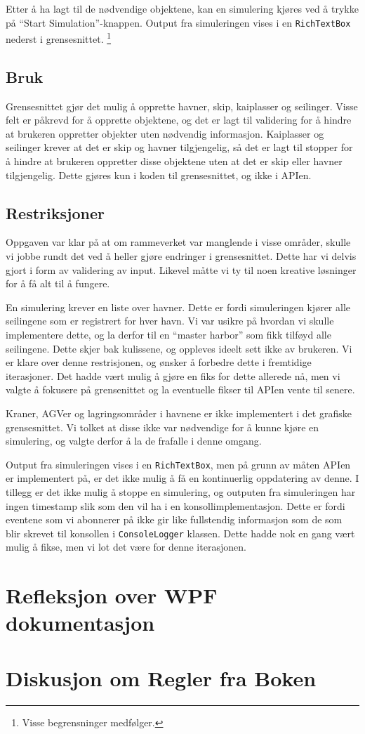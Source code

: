 \documentclass[12pt]{article}
\begin{document}
Etter å ha lagt til de nødvendige objektene, kan en simulering kjøres ved å trykke på ``Start Simulation''-knappen.
Output fra simuleringen vises i en \texttt{RichTextBox} nederst i grensesnittet. \footnote{Visse begrensninger medfølger.}

\subsection{Bruk}
Grensesnittet gjør det mulig å opprette havner, skip, kaiplasser og seilinger. Visse felt er påkrevd for å opprette objektene, 
og det er lagt til validering for å hindre at brukeren oppretter objekter uten nødvendig informasjon. 
Kaiplasser og seilinger krever at det er skip og havner tilgjengelig, så det er lagt til stopper for å hindre at brukeren oppretter
disse objektene uten at det er skip eller havner tilgjengelig. Dette gjøres kun i koden til grensesnittet, og ikke i APIen.

\subsection{Restriksjoner}
Oppgaven var klar på at om rammeverket var manglende i visse områder, skulle vi jobbe rundt det ved å 
heller gjøre endringer i grensesnittet. Dette har vi delvis gjort i form av validering av input. Likevel måtte 
vi ty til noen kreative løsninger for å få alt til å fungere.

En simulering krever en liste over havner. Dette er fordi simuleringen kjører alle seilingene som er 
registrert for hver havn. Vi var usikre på hvordan vi skulle implementere dette, og la derfor til
en ``master harbor'' som fikk tilføyd alle seilingene. Dette skjer bak kulissene, og oppleves ideelt sett
ikke av brukeren. Vi er klare over denne restrisjonen, og ønsker å forbedre dette i fremtidige iterasjoner.
Det hadde vært mulig å gjøre en fiks for dette allerede nå, men vi valgte å fokusere på grensenittet og la
eventuelle fikser til APIen vente til senere.

Kraner, AGVer og lagringsområder i havnene er ikke implementert i det grafiske grensesnittet. Vi tolket at disse
ikke var nødvendige for å kunne kjøre en simulering, og valgte derfor å la de frafalle i denne omgang.

Output fra simuleringen vises i en \texttt{RichTextBox}, men på grunn av måten APIen er implementert på, 
er det ikke mulig å få en kontinuerlig oppdatering av denne. I tillegg er det ikke mulig å stoppe en simulering,
og outputen fra simuleringen har ingen timestamp slik som den vil ha i en konsollimplementasjon. Dette er fordi eventene
som vi abonnerer på ikke gir like fullstendig informasjon som de som blir skrevet til konsollen i \texttt{ConsoleLogger} 
klassen. Dette hadde nok en gang vært mulig å fikse, men vi lot det være for denne iterasjonen.
\section{Refleksjon over WPF dokumentasjon}


\section{Diskusjon om Regler fra Boken}
\end{document}
